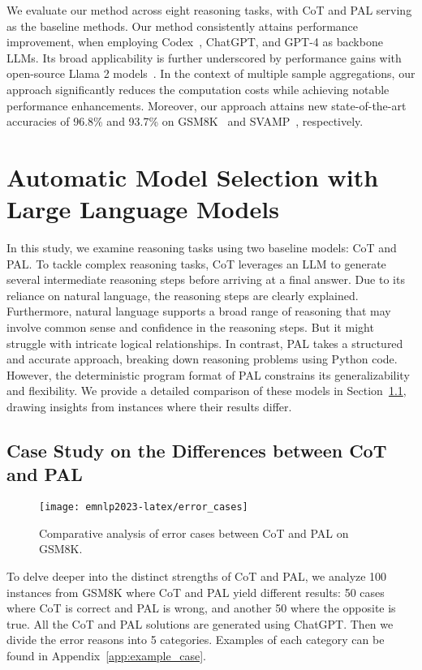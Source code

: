 \documentclass[11pt]{article}
\begin{document}
We evaluate our method across eight reasoning tasks, with CoT and PAL serving as the baseline methods. Our method consistently attains performance improvement, when employing Codex~\citep{Chen2021EvaluatingLL}, ChatGPT, and GPT-4 as backbone LLMs. Its broad applicability is further underscored by performance gains with open-source Llama 2 models~\citep{Touvron2023Llama2O}. In the context of multiple sample aggregations, our approach significantly reduces the computation costs while achieving notable performance enhancements. Moreover, our approach attains new state-of-the-art accuracies of 96.8\%  and 93.7\% on GSM8K~\citep{Cobbe2021TrainingVT} and SVAMP~\citep{Patel2021AreNM}, respectively.

\section{Automatic Model Selection with Large Language Models}
In this study, we examine reasoning tasks using two baseline models: CoT and PAL. To tackle complex reasoning tasks, CoT leverages an LLM to generate several intermediate reasoning steps before arriving at a final answer. Due to its reliance on natural language, the reasoning steps are clearly explained. Furthermore, natural language supports a broad range of reasoning that may involve common sense and confidence in the reasoning steps. But it might struggle with intricate logical relationships. In contrast, PAL takes a structured and accurate approach, breaking down reasoning problems using Python code. However, the deterministic program format of PAL constrains its generalizability and flexibility. We provide a detailed comparison of these models in Section~\ref{sec:case_difference}, drawing insights from instances where their results differ.

\subsection{Case Study on the Differences between CoT and PAL}
\label{sec:case_difference}
\begin{figure}[!h]
    \centering
    \texttt{[image: emnlp2023-latex/error\_cases]}
    \caption{Comparative analysis of error cases between CoT and PAL on GSM8K.}
    \label{fig:case_study}
\end{figure}

To delve deeper into the distinct strengths of CoT and PAL, we analyze 100 instances from GSM8K where CoT and PAL yield different results: 50 cases where CoT is correct and PAL is wrong, and another 50 where the opposite is true. All the CoT and PAL solutions are generated using ChatGPT. Then we divide the error reasons into 5 categories. Examples of each category can be found in Appendix~\ref{app:example_case}.
\end{document}
